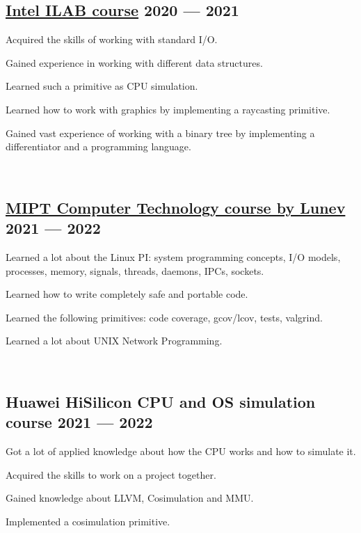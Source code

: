 \subsection{{\href{https://github.com/Hollbrok/Ilab-2020-21}{Intel ILAB course}  \hfill 2020 --- 2021}}

\begin{zitemize}
\item Acquired the skills of working with standard I/O.
\item Gained experience in working with different data structures.
\item Learned such a primitive as CPU simulation.
\item Learned how to work with graphics by implementing a raycasting primitive.
\item Gained vast experience of working with a binary tree by implementing a differentiator and a programming language.
\end{zitemize}

\

\subsection{{\href{https://github.com/Hollbrok/System-Programming}{MIPT Computer Technology course by Lunev} \hfill 2021 --- 2022}}

\begin{zitemize}
\item Learned a lot about the Linux PI: system programming concepts, I/O models, processes, memory, signals, threads, daemons, IPCs, sockets.
\item Learned how to write completely safe and portable code.
\item Learned the following primitives: code coverage, gcov/lcov, tests, valgrind.
\item Learned a lot about UNIX Network Programming.
\end{zitemize}

\

\subsection{{Huawei HiSilicon CPU and OS simulation course \hfill 2021 --- 2022}}

\begin{zitemize}
\item Got a lot of applied knowledge about how the CPU works and how to simulate it.
\item Acquired the skills to work on a project together.
\item Gained knowledge about LLVM, Cosimulation and MMU.
\item Implemented a cosimulation primitive.
\end{zitemize}

